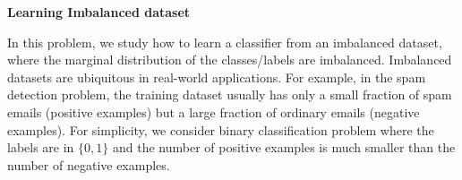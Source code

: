 \item {} {\bf Learning Imbalanced dataset}

In this problem, we study how to learn a classifier from an imbalanced dataset, where the marginal distribution of the classes/labels are imbalanced. Imbalanced datasets are ubiquitous in real-world applications. For example, in the spam detection problem, the training dataset usually has only a small fraction of spam emails (positive examples) but a large fraction of ordinary emails (negative examples). For simplicity, we consider binary classification problem where the labels are in $\{0,1\}$ and the number of positive examples is much smaller than the number of negative examples. 


\begin{enumerate}
        
        \ifnum{} {
	  
        }\fi

		
		\ifnum{} {
			
		}\fi

		
		\ifnum{} {
		
		}\fi

        
        \ifnum{} {
        	
        }\fi
   

    
\end{enumerate}
